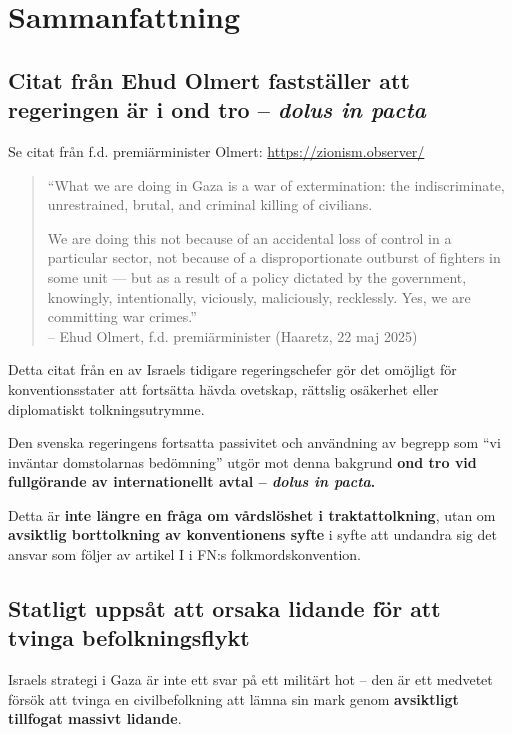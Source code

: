 \section{Sammanfattning}
\subsection*{Citat från Ehud Olmert fastställer att regeringen är i ond tro – \textit{dolus in pacta}}


Se citat från f.d. premiärminister Olmert: \url{https://zionism.observer/}

\begin{quote}
\small
“What we are doing in Gaza is a war of extermination: the indiscriminate, unrestrained, brutal, and criminal killing of civilians.

We are doing this not because of an accidental loss of control in a particular sector, not because of a disproportionate outburst of fighters in some unit — but as a result of a policy dictated by the government, knowingly, intentionally, viciously, maliciously, recklessly. Yes, we are committing war crimes.”\\
\hfill – Ehud Olmert, f.d. premiärminister (Haaretz, 22 maj 2025)
\end{quote}

\noindent
Detta citat från en av Israels tidigare regeringschefer gör det omöjligt för konventionsstater att fortsätta hävda ovetskap, rättslig osäkerhet eller diplomatiskt tolkningsutrymme.

\noindent
Den svenska regeringens fortsatta passivitet och användning av begrepp som “vi inväntar domstolarnas bedömning” utgör mot denna bakgrund \textbf{ond tro vid fullgörande av internationellt avtal – \textit{dolus in pacta}.}

\noindent
Detta är \textbf{inte längre en fråga om vårdslöshet i traktattolkning}, utan om \textbf{avsiktlig borttolkning av konventionens syfte} i syfte att undandra sig det ansvar som följer av artikel I i FN:s folkmordskonvention.

\bigskip
\subsection*{ Statligt uppsåt att orsaka lidande för att tvinga befolkningsflykt}

Israels strategi i Gaza är inte ett svar på ett militärt hot – den är ett medvetet försök att tvinga en civilbefolkning att lämna sin mark genom \textbf{avsiktligt tillfogat massivt lidande}.

